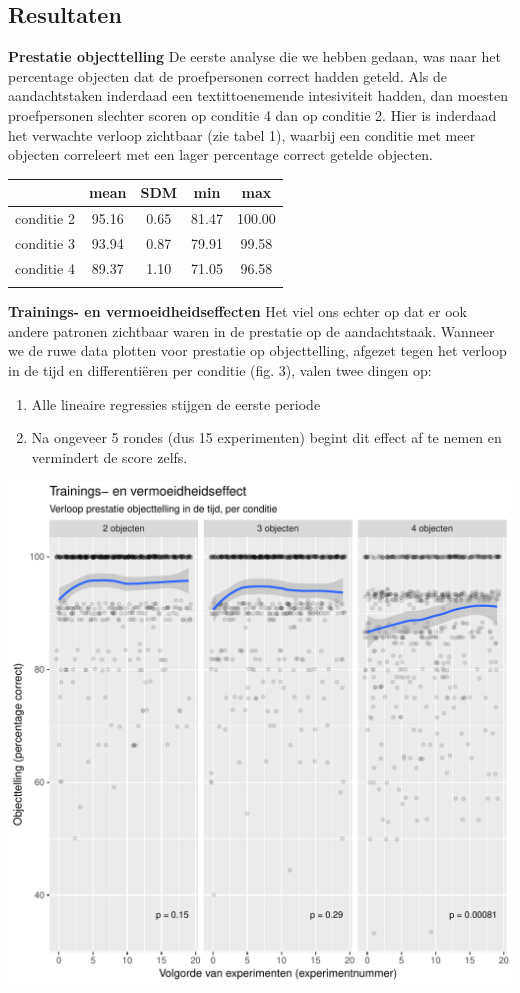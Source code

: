 \documentclass[a0,portrait]{a0poster}
\begin{document}
\begin{multicols}{3}
\section*{Resultaten}
\textbf{Prestatie objecttelling} De eerste analyse die we hebben gedaan, was naar het percentage objecten dat de proefpersonen correct hadden geteld. Als de aandachtstaken inderdaad een textit{toenemende intesiviteit} hadden, dan moesten proefpersonen slechter scoren op conditie 4 dan op conditie 2. Hier is inderdaad het verwachte verloop zichtbaar (zie tabel 1), waarbij een conditie met meer objecten correleert met een lager percentage correct getelde objecten.
\begin{center}
\begin{tabular}{c c c c c}
	 &  mean  & SDM & min & max\\
	\hline
	conditie 2 & 95.16 & 0.65 & 81.47 & 100.00\\
	conditie 3 & 93.94 & 0.87 & 79.91 & 99.58\\
	conditie 4 & 89.37 & 1.10 & 71.05 & 96.58\\
	\hline\\
\end{tabular}
\end{center}
\textbf{Trainings- en vermoeidheidseffecten} Het viel ons echter op dat er ook andere patronen zichtbaar waren in de prestatie op de aandachtstaak. Wanneer we de ruwe data plotten voor prestatie op objecttelling, afgezet tegen het verloop in de tijd en differenti\"eren per conditie (fig. 3), valen twee dingen op:
\begin{enumerate}
	\item Alle lineaire regressies stijgen de eerste periode
	\item Na ongeveer 5 rondes (dus 15 experimenten) begint dit effect af te nemen en vermindert de score zelfs.
\end{enumerate}
 \begin{center}\vspace{1cm}
	\includegraphics[width=0.8\linewidth]{training-grid.pdf}

\end{center}
\end{multicols}
\end{document}
